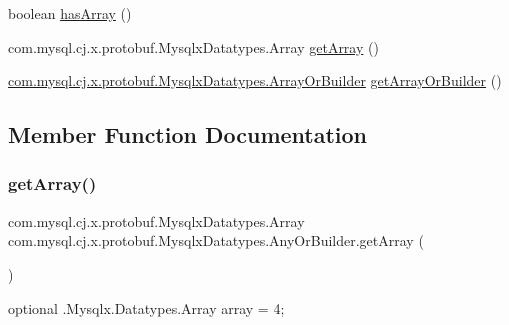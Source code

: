 \begin{DoxyCompactItemize}
boolean \mbox{\hyperlink{interfacecom_1_1mysql_1_1cj_1_1x_1_1protobuf_1_1_mysqlx_datatypes_1_1_any_or_builder_ad6e513706242d3ebb5d45729082b3764}{has\+Array}} ()
\item 
com.\+mysql.\+cj.\+x.\+protobuf.\+Mysqlx\+Datatypes.\+Array \mbox{\hyperlink{interfacecom_1_1mysql_1_1cj_1_1x_1_1protobuf_1_1_mysqlx_datatypes_1_1_any_or_builder_af59cab00d77b11947f59549303e462f2}{get\+Array}} ()
\item 
\mbox{\hyperlink{interfacecom_1_1mysql_1_1cj_1_1x_1_1protobuf_1_1_mysqlx_datatypes_1_1_array_or_builder}{com.\+mysql.\+cj.\+x.\+protobuf.\+Mysqlx\+Datatypes.\+Array\+Or\+Builder}} \mbox{\hyperlink{interfacecom_1_1mysql_1_1cj_1_1x_1_1protobuf_1_1_mysqlx_datatypes_1_1_any_or_builder_ad1ec29ee5d6392c6df2753fbfb99ee68}{get\+Array\+Or\+Builder}} ()
\end{DoxyCompactItemize}


\subsection{Member Function Documentation}
\mbox{\label{interfacecom_1_1mysql_1_1cj_1_1x_1_1protobuf_1_1_mysqlx_datatypes_1_1_any_or_builder_af59cab00d77b11947f59549303e462f2}} 
\subsubsection{\texorpdfstring{get\+Array()}{getArray()}}
{\footnotesize\ttfamily com.\+mysql.\+cj.\+x.\+protobuf.\+Mysqlx\+Datatypes.\+Array com.\+mysql.\+cj.\+x.\+protobuf.\+Mysqlx\+Datatypes.\+Any\+Or\+Builder.\+get\+Array (\begin{DoxyParamCaption}{ }\end{DoxyParamCaption})}

{\ttfamily optional .Mysqlx.\+Datatypes.\+Array array = 4;} \mbox{\label{interfacecom_1_1mysql_1_1cj_1_1x_1_1protobuf_1_1_mysqlx_datatypes_1_1_any_or_builder_ad1ec29ee5d6392c6df2753fbfb99ee68}} 
